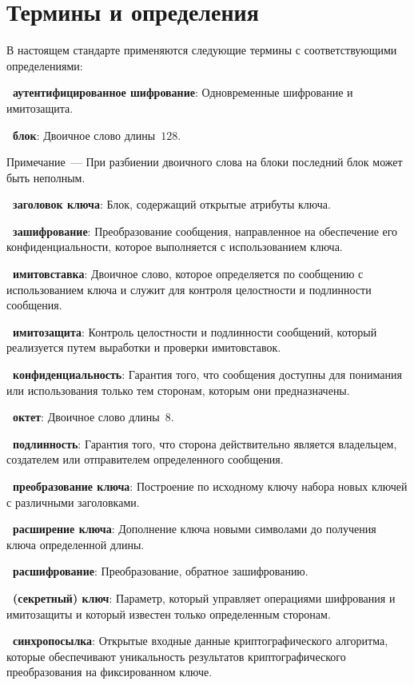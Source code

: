 \chapter{Термины и определения}

В настоящем стандарте применяются  
следующие термины с соответствующими определениями:

{\bf \thedefctr~аутентифицированное шифрование}:
Одновременные шифрование и имитозащита.

{\bf \thedefctr~блок}:
Двоичное слово длины~$128$.

\begin{note}
Примечание~--- При разбиении двоичного слова на блоки последний блок
может быть неполным.
\end{note}

{\bf \thedefctr~заголовок ключа}:
Блок, содержащий открытые атрибуты ключа.

{\bf \thedefctr~зашифрование}:
Преобразование сообщения,
направленное на обеспечение его конфиденциальности,
которое выполняется с использованием ключа.

{\bf \thedefctr~имитовставка}:
Двоичное слово, 
которое определяется по сообщению с использованием ключа 
и служит для контроля целостности и подлинности сообщения.

{\bf \thedefctr~имитозащита}:
Контроль целостности и подлинности сообщений, 
который реализуется путем выработки и проверки имитовставок.

{\bf \thedefctr~конфиденциальность}:
Гарантия того, что сообщения доступны для понимания или использования
только тем сторонам, которым они предназначены.

{\bf \thedefctr~октет}:
Двоичное слово длины~$8$.

{\bf \thedefctr~подлинность}:
Гарантия того, что сторона действительно является владельцем, 
создателем или отправителем определенного сообщения.

{\bf \thedefctr~преобразование ключа}:
Построение по исходному ключу набора новых ключей 
с различными заголовками.

{\bf \thedefctr~расширение ключа}:
Дополнение ключа новыми символами до получения ключа определенной длины.

{\bf \thedefctr~расшифрование}:
Преобразование, обратное зашифрованию.

{\bf \thedefctr~(секретный) ключ}:
Параметр, который управляет операциями шифрования 
и имитозащиты и который известен только определенным сторонам.

{\bf \thedefctr~синхропосылка}:
Открытые входные данные криптографического алгоритма,
которые обеспечивают уникальность результатов 
криптографического преобразования на фиксированном ключе.

